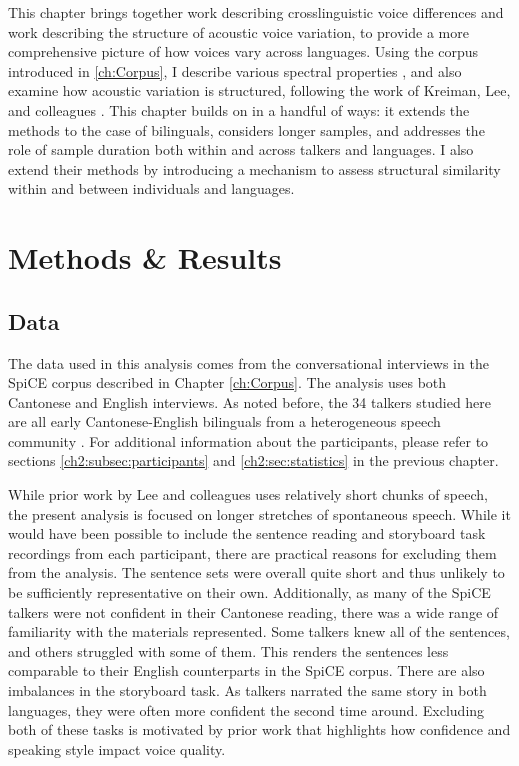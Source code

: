 This chapter brings together work describing crosslinguistic voice differences and work describing the structure of acoustic voice variation, to provide a more comprehensive picture of how voices vary across languages. Using the corpus introduced in \ref{ch:Corpus}, I describe various spectral properties \citet[e.g.][]{ng_2012_ltas}, and also examine how acoustic variation is structured, following the work of Kreiman, Lee, and colleagues \citep{kreiman_2014_theory,lee_2019_acoustic}. This chapter builds on \citet{lee_2019_acoustic} in a handful of ways: it extends the methods to the case of bilinguals, considers longer samples, and addresses the role of sample duration both within and across talkers and languages. I also extend their methods by introducing a mechanism to assess structural similarity within and between individuals and languages. 

\section{Methods \& Results}\label{ch3:sec:methods_results}
\subsection{Data}\label{ch3:sec:data}
The data used in this analysis comes from the conversational interviews in the SpiCE corpus described in Chapter \ref{ch:Corpus}. The analysis uses both Cantonese and English interviews. As noted before, the 34 talkers studied here are all early Cantonese-English bilinguals from a heterogeneous speech community \citep{liang_2015_china}. For additional information about the participants, please refer to sections \ref{ch2:subsec:participants} and \ref{ch2:sec:statistics} in the previous chapter. 

While prior work by Lee and colleagues \citep[e.g.,][]{lee_2019_acoustic} uses relatively short chunks of speech, the present analysis is focused on longer stretches of spontaneous speech. While it would have been possible to include the sentence reading and storyboard task recordings from each participant, there are practical reasons for excluding them from the analysis. The sentence sets were overall quite short and thus unlikely to be sufficiently representative on their own. Additionally, as many of the SpiCE talkers were not confident in their Cantonese reading, there was a wide range of familiarity with the materials represented. Some talkers knew all of the sentences, and others struggled with some of them. This renders the sentences less comparable to their English counterparts in the SpiCE corpus. There are also imbalances in the storyboard task. As talkers narrated the same story in both languages, they were often more confident the second time around. Excluding both of these tasks is motivated by prior work that highlights how confidence \citep{jarvinen_2013_speaking} and speaking style \citep{lee_2017_bilingual} impact voice quality. 

